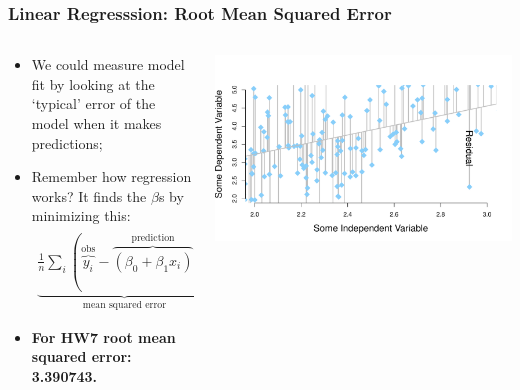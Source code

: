 \documentclass[aspectratio=169]{beamer}
\theoremstyle{principle}
\begin{document}
\begin{frame}
\frametitle{Linear Regresssion: Root Mean Squared Error}

\begin{columns}
\begin{column}{0.5\textwidth}

\begin{itemize}
\item We could measure model fit by looking at the `typical' error of the model when it makes predictions;
\bigskip

\item Remember how regression works?  It finds the $\beta$s by minimizing this:
\begin{align*}
\underbrace{\frac{1}{n}\sum_i(\overbrace{y_i}^{\mbox{obs}} - \overbrace{(\beta_0 + \beta_1 x_i)}^{\mbox{prediction}})^2}_{\mbox{mean squared error}}
\end{align*}

\item[] \color{white} \textbf{For HW7 root mean squared error: 3.390743.}
\end{itemize}

\end{column}
\begin{column}{0.5\textwidth}
\includegraphics[scale=0.35]{point_cloud_line_zoomed_residuals.pdf}
\end{column}
\end{columns}

\end{frame}
\end{document}
